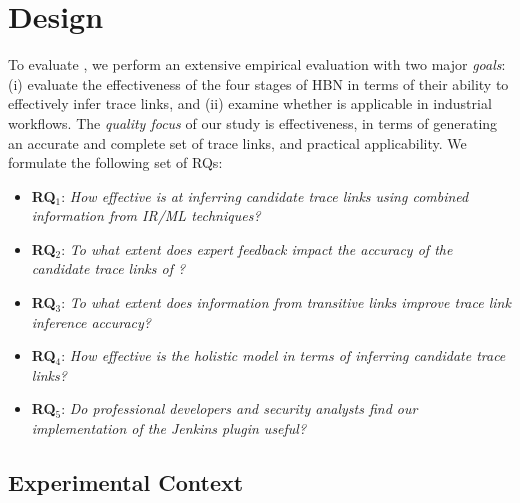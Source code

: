 \section{Design}
\label{sec:design-hbn}

To evaluate \Comet, we perform an extensive empirical evaluation with two major \textit{goals}: (i) evaluate the effectiveness of the four stages of \Comets HBN in terms of their ability to effectively infer trace links, and (ii) examine whether \Comet is applicable in industrial workflows. The \textit{quality focus} of our study is \Comets effectiveness, in terms of generating an accurate and complete set of trace links, and practical applicability. We formulate the following set of RQs:

\begin{itemize}

	\item{\textbf{RQ$_1$}: \textit{How effective is \Comet at inferring candidate trace links using combined information from IR/ML techniques?}}

	\item{\textbf{RQ$_2$}: \textit{To what extent does expert feedback impact the accuracy of the candidate trace links of \Comet?}}

	\item{\textbf{RQ$_3$}: \textit{To what extent does information from transitive links improve \Comets trace link inference accuracy?}}

	\item{\textbf{RQ$_4$}: \textit{How effective is the holistic \Comet model in terms of inferring candidate trace links?}}

	\item{\textbf{RQ$_5$}: \textit{Do professional developers and security analysts find our implementation of the \Comet Jenkins plugin useful?}}
	
\end{itemize}

\subsection{Experimental Context}
\label{sub:exp-context}



